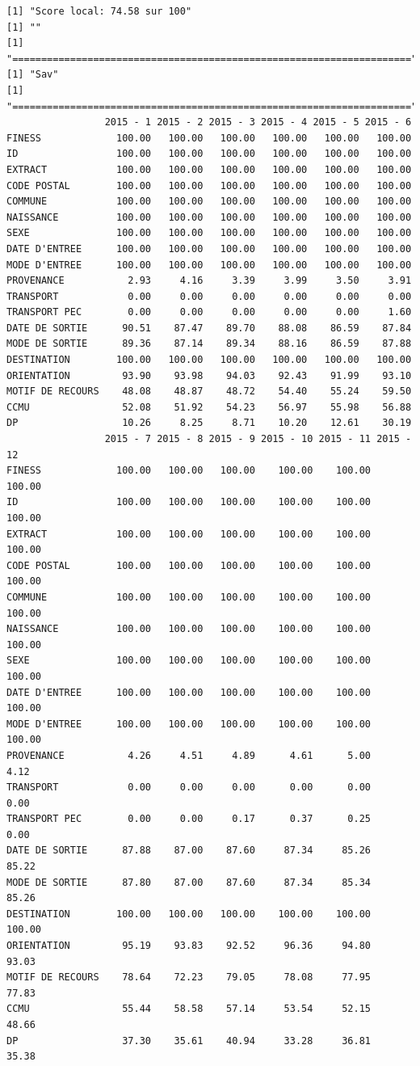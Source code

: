 \documentclass[]{article}
\begin{document}
\begin{verbatim}
[1] "Score local: 74.58 sur 100"
[1] ""
[1] "====================================================================="
[1] "Sav"
[1] "====================================================================="
                 2015 - 1 2015 - 2 2015 - 3 2015 - 4 2015 - 5 2015 - 6
FINESS             100.00   100.00   100.00   100.00   100.00   100.00
ID                 100.00   100.00   100.00   100.00   100.00   100.00
EXTRACT            100.00   100.00   100.00   100.00   100.00   100.00
CODE POSTAL        100.00   100.00   100.00   100.00   100.00   100.00
COMMUNE            100.00   100.00   100.00   100.00   100.00   100.00
NAISSANCE          100.00   100.00   100.00   100.00   100.00   100.00
SEXE               100.00   100.00   100.00   100.00   100.00   100.00
DATE D'ENTREE      100.00   100.00   100.00   100.00   100.00   100.00
MODE D'ENTREE      100.00   100.00   100.00   100.00   100.00   100.00
PROVENANCE           2.93     4.16     3.39     3.99     3.50     3.91
TRANSPORT            0.00     0.00     0.00     0.00     0.00     0.00
TRANSPORT PEC        0.00     0.00     0.00     0.00     0.00     1.60
DATE DE SORTIE      90.51    87.47    89.70    88.08    86.59    87.84
MODE DE SORTIE      89.36    87.14    89.34    88.16    86.59    87.88
DESTINATION        100.00   100.00   100.00   100.00   100.00   100.00
ORIENTATION         93.90    93.98    94.03    92.43    91.99    93.10
MOTIF DE RECOURS    48.08    48.87    48.72    54.40    55.24    59.50
CCMU                52.08    51.92    54.23    56.97    55.98    56.88
DP                  10.26     8.25     8.71    10.20    12.61    30.19
                 2015 - 7 2015 - 8 2015 - 9 2015 - 10 2015 - 11 2015 - 12
FINESS             100.00   100.00   100.00    100.00    100.00    100.00
ID                 100.00   100.00   100.00    100.00    100.00    100.00
EXTRACT            100.00   100.00   100.00    100.00    100.00    100.00
CODE POSTAL        100.00   100.00   100.00    100.00    100.00    100.00
COMMUNE            100.00   100.00   100.00    100.00    100.00    100.00
NAISSANCE          100.00   100.00   100.00    100.00    100.00    100.00
SEXE               100.00   100.00   100.00    100.00    100.00    100.00
DATE D'ENTREE      100.00   100.00   100.00    100.00    100.00    100.00
MODE D'ENTREE      100.00   100.00   100.00    100.00    100.00    100.00
PROVENANCE           4.26     4.51     4.89      4.61      5.00      4.12
TRANSPORT            0.00     0.00     0.00      0.00      0.00      0.00
TRANSPORT PEC        0.00     0.00     0.17      0.37      0.25      0.00
DATE DE SORTIE      87.88    87.00    87.60     87.34     85.26     85.22
MODE DE SORTIE      87.80    87.00    87.60     87.34     85.34     85.26
DESTINATION        100.00   100.00   100.00    100.00    100.00    100.00
ORIENTATION         95.19    93.83    92.52     96.36     94.80     93.03
MOTIF DE RECOURS    78.64    72.23    79.05     78.08     77.95     77.83
CCMU                55.44    58.58    57.14     53.54     52.15     48.66
DP                  37.30    35.61    40.94     33.28     36.81     35.38
\end{verbatim}
\end{document}
